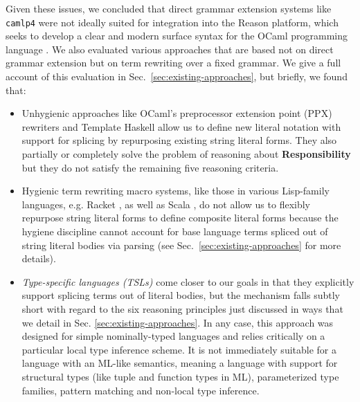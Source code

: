 \documentclass[acmsmall,screen]{acmart}
\newcommand{\li}[1]{\lstinline[basicstyle=\ttfamily\fontsize{9pt}{1em}\selectfont]{#1}}
\begin{document}
Given these issues, we concluded that direct grammar extension systems like \li{camlp4} were not ideally suited for integration into the Reason platform, which seeks to develop a clear and modern surface syntax for the OCaml programming language \cite{reason-what}. We also evaluated various approaches that are based not on direct grammar extension but on term rewriting over a fixed grammar. We give a full account of this evaluation in Sec.~\ref{sec:existing-approaches}, but briefly, we found that:
\begin{itemize}[leftmargin=15px]
\item Unhygienic approaches like OCaml's preprocessor extension point (PPX) rewriters \cite{ocaml-manual} and Template Haskell \cite{SheardPeytonJones:Haskell-02,mainland2007s} allow us to define new literal notation with support for splicing by repurposing existing string literal forms. They also partially or completely solve the problem of reasoning about \textbf{Responsibility} but they do not satisfy the remaining five reasoning criteria.
\item Hygienic term rewriting macro systems, like those in various Lisp-family languages, 
e.g. Racket \cite{Flatt:2012:CLR:2063176.2063195}, as well as Scala \cite{ScalaMacros2013}, do not allow us to flexibly repurpose string literal forms to define composite literal forms because the hygiene discipline cannot account for base language terms spliced out of string literal bodies via parsing (see Sec.~\ref{sec:existing-approaches} for more details). %
\item \emph{Type-specific languages (TSLs)} \cite{TSLs} come closer to our goals in that they explicitly support splicing terms out of literal bodies, but the mechanism falls subtly short with regard to the six reasoning principles just discussed in ways that we detail in Sec. \ref{sec:existing-approaches}. In any case, this approach was designed for simple nominally-typed languages and relies critically on a particular local type inference scheme. It is not immediately suitable for a language with an ML-like semantics, meaning a language with support for structural types (like tuple and function types in ML), parameterized type families, pattern matching and non-local type inference.
\end{itemize}
\end{document}
